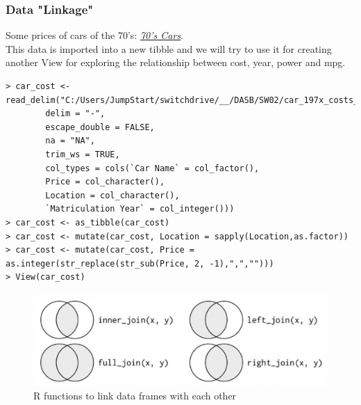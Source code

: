 \documentclass[a4paper]{article}
\begin{document}
			\subsubsection{Data "Linkage"}
			
			Some prices of cars of the 70's: \href{http://www.thepeoplehistory.com/70scars.html}{\textit{\underline{70's Cars}}}. \\
			This data is imported into a new tibble and we will try to use it for creating another View for exploring the relationship between cost, year, power and mpg.
			
			\begin{lstlisting}
> car_cost <-read_delim("C:/Users/JumpStart/switchdrive/__/DASB/SW02/car_197x_costs_2.csv", 
		delim = "-", 
		escape_double = FALSE, 
		na = "NA", 
		trim_ws = TRUE, 
		col_types = cols(`Car Name` = col_factor(), 
		Price = col_character(), 
		Location = col_character(), 
		`Matriculation Year` = col_integer()))
> car_cost <- as_tibble(car_cost)
> car_cost <- mutate(car_cost, Location = sapply(Location,as.factor))
> car_cost <- mutate(car_cost, Price = as.integer(str_replace(str_sub(Price, 2, -1),",","")))
> View(car_cost)
			\end{lstlisting}
	
			\begin{figure}[htb!]
				\centering
				\includegraphics[width=.7\textwidth]{img/sw02/data_linkage.png}
				\caption{R functions to link data frames with each other}
			\end{figure}
	
\end{document}
